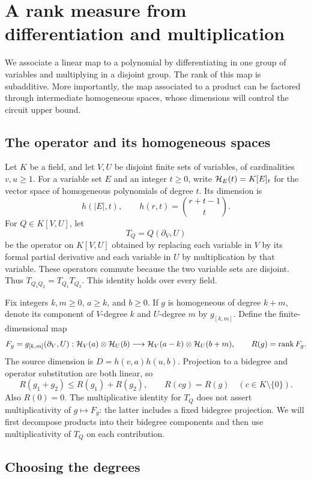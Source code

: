 \section{A rank measure from differentiation and multiplication}
\label{sec:rank}

We associate a linear map to a polynomial by differentiating in one
group of variables and multiplying in a disjoint group.  The rank of
this map is subadditive.  More importantly, the map associated to a
product can be factored through intermediate homogeneous spaces, whose
dimensions will control the circuit upper bound.

\subsection{The operator and its homogeneous spaces}

Let $K$ be a field, and let $V,U$ be disjoint finite sets of variables,
of cardinalities $v,u\ge1$.  For a variable set $E$ and an integer
$t\ge0$, write $\mathcal H_E(t)=K[E]_t$ for the vector space of homogeneous
polynomials of degree $t$.  Its dimension is
\[
 h(|E|,t),\qquad h(r,t)=\binom{r+t-1}{t}.
\]
For $Q\in K[V,U]$, let
\[
 T_Q=Q(\partial_V,U)
\]
be the operator on $K[V,U]$ obtained by replacing each variable in $V$
by its formal partial derivative and each variable in $U$ by
multiplication by that variable.  These operators commute because the
two variable sets are disjoint.  Thus $T_{Q_1Q_2}=T_{Q_1}T_{Q_2}$.
This identity holds over every field.

Fix integers $k,m\ge0$, $a\ge k$, and $b\ge0$.  If $g$ is homogeneous
of degree $k+m$, denote its component of $V$-degree $k$ and $U$-degree
$m$ by $g_{[k,m]}$.  Define the finite-dimensional map
\begin{equation}
\label{eq:rank-map}
 F_g=g_{[k,m]}(\partial_V,U):
 \mathcal H_V(a)\otimes\mathcal H_U(b)
 \longrightarrow
 \mathcal H_V(a-k)\otimes\mathcal H_U(b+m),
 \qquad R(g)=\operatorname{rank} F_g.
\end{equation}
The source dimension is $D=h(v,a)h(u,b)$.  Projection to a bidegree
and operator substitution are both linear, so
\[
 R(g_1+g_2)\le R(g_1)+R(g_2),\qquad
 R(cg)=R(g)\quad(c\in K\setminus\{0\}).
\]
Also $R(0)=0$.  The multiplicative identity for $T_Q$ does not assert
multiplicativity of $g\mapsto F_g$: the latter includes a fixed
bidegree projection.  We will first decompose products into their
bidegree components and then use multiplicativity of $T_Q$ on each
contribution.

\subsection{Choosing the degrees}

